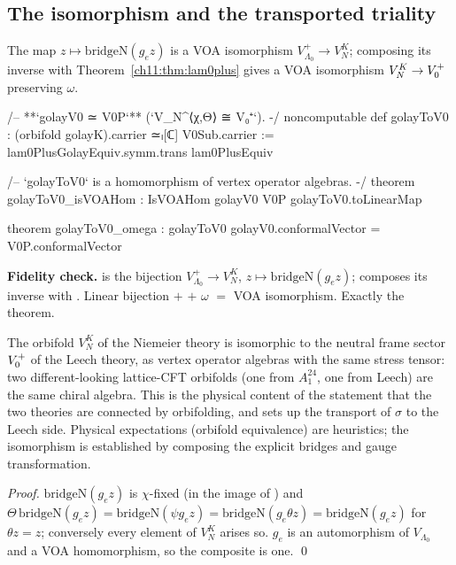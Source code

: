 \subsection{The isomorphism and the transported triality}

\begin{theorem}\label{ch11:thm:golayToV0}
The map $z\mapsto\mathrm{bridgeN}(g_ez)$ is a VOA isomorphism $V_{\Lambda_0}^+\to V_N^K$; composing its
inverse with Theorem~\ref{ch11:thm:lam0plus} gives a VOA isomorphism $V_N^K\to V_0^{+}$ preserving $\omega$.
\end{theorem}
\begin{leancode}
/-- **`golayV0 ≃ V0P`** (`V_N^{⟨χ,Θ⟩} ≅ V₀⁺`). -/
noncomputable def golayToV0 : (orbifold golayK).carrier ≃ₗ[ℂ] V0Sub.carrier :=
  lam0PlusGolayEquiv.symm.trans lam0PlusEquiv

/-- `golayToV0` is a homomorphism of vertex operator algebras. -/
theorem golayToV0_isVOAHom : IsVOAHom golayV0 V0P golayToV0.toLinearMap

theorem golayToV0_omega : golayToV0 golayV0.conformalVector = V0P.conformalVector
\end{leancode}
\begin{dictionary}
\textbf{Fidelity check.}   is the bijection $V_{\Lambda_0}^+\to V_N^K$,
$z\mapsto\mathrm{bridgeN}(g_ez)$;  composes its inverse with .
Linear bijection $+$  $+$ $\omega$ $=$ VOA isomorphism.  Exactly the theorem.
\end{dictionary}

\begin{physics}
The orbifold $V_N^K$ of the Niemeier theory is isomorphic to the neutral frame sector $V_0^{+}$ of the Leech theory, as vertex operator algebras with the same stress tensor: two different-looking lattice-CFT orbifolds (one from $A_1^{24}$, one from Leech) are the same chiral algebra. This is the physical content of the statement that the two theories are connected by orbifolding, and sets up the transport of $\sigma$ to the Leech side. Physical expectations (orbifold equivalence) are heuristics; the isomorphism is established by composing the explicit bridges and gauge transformation.
\end{physics}
\emph{Proof.}  $\mathrm{bridgeN}(g_ez)$ is $\chi$-fixed (in the image of ) and
$\Theta\,\mathrm{bridgeN}(g_ez)=\mathrm{bridgeN}(\psi g_ez)=\mathrm{bridgeN}(g_e\theta z)=\mathrm{bridgeN}(g_ez)$
for $\theta z=z$; conversely every element of $V_N^K$ arises so.  $g_e$ is an automorphism of
$V_{\Lambda_0}$ and  a VOA homomorphism, so the composite is one. \qed

